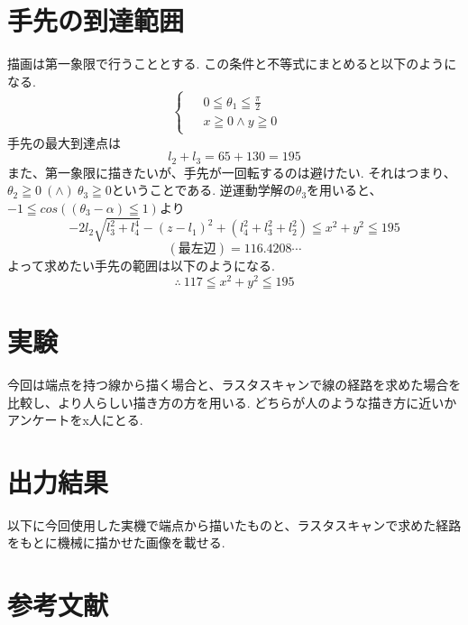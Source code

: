 \documentclass[a4j]{jarticle}			%
\begin{document}
\begin{multicols}{2}
\section{手先の到達範囲}
描画は第一象限で行うこととする.
この条件と不等式にまとめると以下のようになる.
\small
\begin{equation*}
	\left\{
		\begin{array}{c}
			\begin{split}
				&0 \leqq \theta_1 \leqq \frac{\pi}{2} & \\
				&x \geqq 0 \land y \geqq 0
			\end{split}
		\end{array}
	\right.
\end{equation*}
\normalsize
手先の最大到達点は
\small
\begin{equation*}
	l_2+l_3=65+130=195
\end{equation*}
\normalsize
また、第一象限に描きたいが、手先が一回転するのは避けたい.
それはつまり、$\theta_2\geqq0\ (\land)\ \theta_3\geqq0$ということである.
逆運動学解の$\theta_3$を用いると、$-1\leqq cos((\theta_3-\alpha)\leqq 1)$より
\small
\begin{equation*}
	-2l_2\sqrt{l_3^2+l_4^4}-(z-l_1)^2+(l_4^2+l_3^2+l_2^2)\leqq x^2+y^2\leqq 195
\end{equation*}
$$
	(\text{最左辺})=116.4208\cdots
$$
\normalsize
よって求めたい手先の範囲は以下のようになる.
\small
\begin{equation*}
	\therefore\ 117 \leqq x^2+y^2 \leqq 195
\end{equation*}
\normalsize
	
\section{実験}
今回は端点を持つ線から描く場合と、ラスタスキャンで線の経路を求めた場合を比較し、より人らしい描き方の方を用いる.
どちらが人のような描き方に近いかアンケートをx人にとる.
\section{出力結果}

以下に今回使用した実機で端点から描いたものと、ラスタスキャンで求めた経路をもとに機械に描かせた画像を載せる.

\section{参考文献}


\end{multicols}
\end{document}

